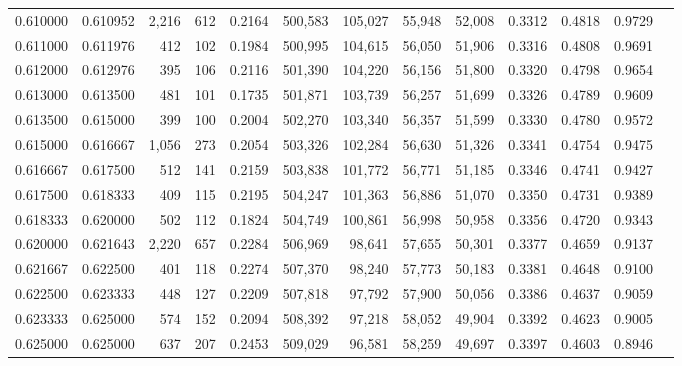\begin{tabular}{rrrrrrrrrrrrr}
0.610000 & 0.610952 & 2,216 & 612 &                                     0.2164 & 500,583 & 105,027 &  55,948 &  52,008 & 0.3312 & 0.4818 & 0.9729 \\
0.611000 & 0.611976 &   412 & 102 &                                     0.1984 & 500,995 & 104,615 &  56,050 &  51,906 & 0.3316 & 0.4808 & 0.9691 \\
0.612000 & 0.612976 &   395 & 106 &                                     0.2116 & 501,390 & 104,220 &  56,156 &  51,800 & 0.3320 & 0.4798 & 0.9654 \\
0.613000 & 0.613500 &   481 & 101 &                                     0.1735 & 501,871 & 103,739 &  56,257 &  51,699 & 0.3326 & 0.4789 & 0.9609 \\
0.613500 & 0.615000 &   399 & 100 &                                     0.2004 & 502,270 & 103,340 &  56,357 &  51,599 & 0.3330 & 0.4780 & 0.9572 \\
0.615000 & 0.616667 & 1,056 & 273 &                                     0.2054 & 503,326 & 102,284 &  56,630 &  51,326 & 0.3341 & 0.4754 & 0.9475 \\
0.616667 & 0.617500 &   512 & 141 &                                     0.2159 & 503,838 & 101,772 &  56,771 &  51,185 & 0.3346 & 0.4741 & 0.9427 \\
0.617500 & 0.618333 &   409 & 115 &                                     0.2195 & 504,247 & 101,363 &  56,886 &  51,070 & 0.3350 & 0.4731 & 0.9389 \\
0.618333 & 0.620000 &   502 & 112 &                                     0.1824 & 504,749 & 100,861 &  56,998 &  50,958 & 0.3356 & 0.4720 & 0.9343 \\
0.620000 & 0.621643 & 2,220 & 657 &                                     0.2284 & 506,969 &  98,641 &  57,655 &  50,301 & 0.3377 & 0.4659 & 0.9137 \\
0.621667 & 0.622500 &   401 & 118 &                                     0.2274 & 507,370 &  98,240 &  57,773 &  50,183 & 0.3381 & 0.4648 & 0.9100 \\
0.622500 & 0.623333 &   448 & 127 &                                     0.2209 & 507,818 &  97,792 &  57,900 &  50,056 & 0.3386 & 0.4637 & 0.9059 \\
0.623333 & 0.625000 &   574 & 152 &                                     0.2094 & 508,392 &  97,218 &  58,052 &  49,904 & 0.3392 & 0.4623 & 0.9005 \\
0.625000 & 0.625000 &   637 & 207 &                                     0.2453 & 509,029 &  96,581 &  58,259 &  49,697 & 0.3397 & 0.4603 & 0.8946 \\

\end{tabular}
